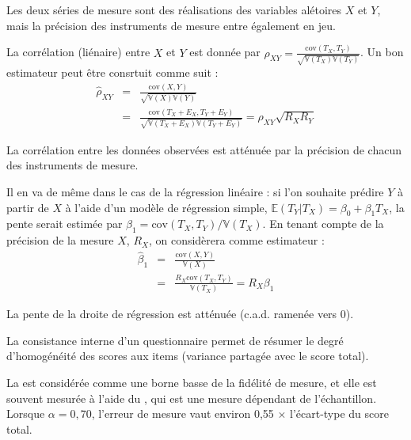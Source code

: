 Les\mark{} deux séries de mesure sont des réalisations des variables alétoires
$X$ et $Y$, mais la précision des instruments de mesure entre également en jeu.


La corrélation (liénaire) entre $X$ et $Y$ est donnée par
$\rho_{XY}=\frac{\text{cov}(T_X,T_Y)}{\sqrt{\mathbb{V}(T_X)\mathbb{V}(T_Y)}}$.
Un bon estimateur peut être consrtuit comme suit :
\begin{eqnarray}\label{eq:corr}
	\hat\rho_{XY} & = & \frac{\text{cov}(X,Y)}{\sqrt{\mathbb{V}(X)\mathbb{V}(Y)}}\nonumber\\
	              & = &
                      \frac{\text{cov}(T_X+E_X,T_Y+E_Y)}{\sqrt{\mathbb{V}(T_X+E_X)\mathbb{V}(T_Y+E_Y)}}
                  =\rho_{XY}\sqrt{R_XR_Y}
\end{eqnarray}

La corrélation entre les données observées est atténuée par la précision de
chacun des instruments de mesure.

\foilhead{}
Il en va de même dans le cas de la régression linéaire : si l'on souhaite
prédire $Y$ à partir de $X$ à l'aide d'un modèle de régression simple,
$\mathbb{E}(T_Y|T_X)=\beta_0+\beta_1T_X$, la pente serait estimée par
$\beta_1=\text{cov}(T_X,T_Y)/\mathbb{V}(T_X)$. En tenant compte de la précision de
la mesure $X$, $R_X$, on considèrera comme estimateur :
\begin{eqnarray}\label{eq:slope}
	\hat\beta_1 & = & \frac{\text{cov}(X,Y)}{\mathbb{V}(X)}\nonumber\\          
              & = & \frac{R_X\text{cov}(T_X,T_Y)}{\mathbb{V}(T_X)}=R_X\beta_1
\end{eqnarray}

La pente de la droite de régression est atténuée (c.a.d. ramenée vers 0).


La consistance interne d'un questionnaire permet de résumer le degré
d'homogénéité des scores aux items (variance partagée avec le score
total).

La  est considérée comme une borne basse de la fidélité de
mesure, et elle est souvent mesurée à l'aide du , qui est une mesure dépendant de l'échantillon. Lorsque $\alpha =
0,70$, l'erreur de mesure vaut environ 0,55 $\times$ l'écart-type du score
total.

